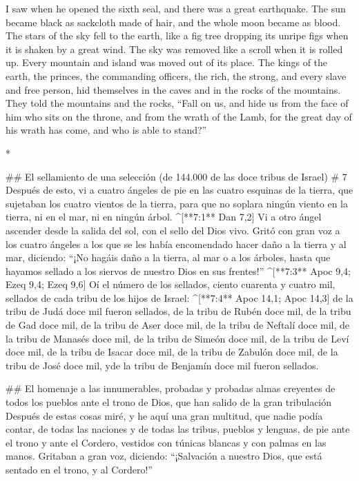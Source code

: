 \begin{paracols}{2}
\begin{english}
 I saw when he opened the sixth seal, and there was a great earthquake. The sun became black as sackcloth made of hair, and the whole moon became as blood.  The stars of the sky fell to the earth, like a fig tree dropping its unripe figs when it is shaken by a great wind.  The sky was removed like a scroll when it is rolled up. Every mountain and island was moved out of its place.  The kings of the earth, the princes, the commanding officers, the rich, the strong, and every slave and free person, hid themselves in the caves and in the rocks of the mountains.  They told the mountains and the rocks, “Fall on us, and hide us from the face of him who sits on the throne, and from the wrath of the Lamb,  for the great day of his wrath has come, and who is able to stand?” 

\end{english}
\switchcolumn[0]*

## El sellamiento de una selección (de 144.000 de las doce tribus de Israel)
# 7
 Después de esto, vi a cuatro ángeles de pie en las cuatro esquinas de la tierra, que sujetaban los cuatro vientos de la tierra, para que no soplara ningún viento en la tierra, ni en el mar, ni en ningún árbol. ^[**7:1** Dan 7,2]  Vi a otro ángel ascender desde la salida del sol, con el sello del Dios vivo. Gritó con gran voz a los cuatro ángeles a los que se les había encomendado hacer daño a la tierra y al mar,  diciendo: “¡No hagáis daño a la tierra, al mar o a los árboles, hasta que hayamos sellado a los siervos de nuestro Dios en sus frentes!” ^[**7:3** Apoc 9,4; Ezeq 9,4; Ezeq 9,6]  Oí el número de los sellados, ciento cuarenta y cuatro mil, sellados de cada tribu de los hijos de Israel: ^[**7:4** Apoc 14,1; Apoc 14,3]  de la tribu de Judá doce mil fueron sellados, de la tribu de Rubén doce mil, de la tribu de Gad doce mil,  de la tribu de Aser doce mil, de la tribu de Neftalí doce mil, de la tribu de Manasés doce mil,  de la tribu de Simeón doce mil, de la tribu de Leví doce mil, de la tribu de Isacar doce mil,  de la tribu de Zabulón doce mil, de la tribu de José doce mil, yde la tribu de Benjamín doce mil fueron sellados.

## El homenaje a las innumerables, probadas y probadas almas creyentes de todos los pueblos ante el trono de Dios, que han salido de la gran tribulación
 Después de estas cosas miré, y he aquí una gran multitud, que nadie podía contar, de todas las naciones y de todas las tribus, pueblos y lenguas, de pie ante el trono y ante el Cordero, vestidos con túnicas blancas y con palmas en las manos.  Gritaban a gran voz, diciendo: “¡Salvación a nuestro Dios, que está sentado en el trono, y al Cordero!”


\end{paracols}
